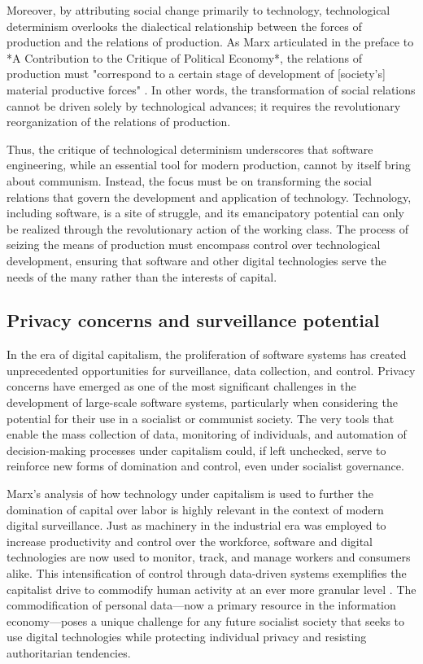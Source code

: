 \begin{refsection}
Moreover, by attributing social change primarily to technology, technological determinism overlooks the dialectical relationship between the forces of production and the relations of production. As Marx articulated in the preface to *A Contribution to the Critique of Political Economy*, the relations of production must "correspond to a certain stage of development of [society's] material productive forces" \cite[pp.~20]{marx_contribution_to_the_critique}. In other words, the transformation of social relations cannot be driven solely by technological advances; it requires the revolutionary reorganization of the relations of production.

Thus, the critique of technological determinism underscores that software engineering, while an essential tool for modern production, cannot by itself bring about communism. Instead, the focus must be on transforming the social relations that govern the development and application of technology. Technology, including software, is a site of struggle, and its emancipatory potential can only be realized through the revolutionary action of the working class. The process of seizing the means of production must encompass control over technological development, ensuring that software and other digital technologies serve the needs of the many rather than the interests of capital.

\subsection{Privacy concerns and surveillance potential}

In the era of digital capitalism, the proliferation of software systems has created unprecedented opportunities for surveillance, data collection, and control. Privacy concerns have emerged as one of the most significant challenges in the development of large-scale software systems, particularly when considering the potential for their use in a socialist or communist society. The very tools that enable the mass collection of data, monitoring of individuals, and automation of decision-making processes under capitalism could, if left unchecked, serve to reinforce new forms of domination and control, even under socialist governance.

Marx’s analysis of how technology under capitalism is used to further the domination of capital over labor is highly relevant in the context of modern digital surveillance. Just as machinery in the industrial era was employed to increase productivity and control over the workforce, software and digital technologies are now used to monitor, track, and manage workers and consumers alike. This intensification of control through data-driven systems exemplifies the capitalist drive to commodify human activity at an ever more granular level \cite[pp.~322]{marx_capital_vol1}. The commodification of personal data—now a primary resource in the information economy—poses a unique challenge for any future socialist society that seeks to use digital technologies while protecting individual privacy and resisting authoritarian tendencies.


\end{refsection}
